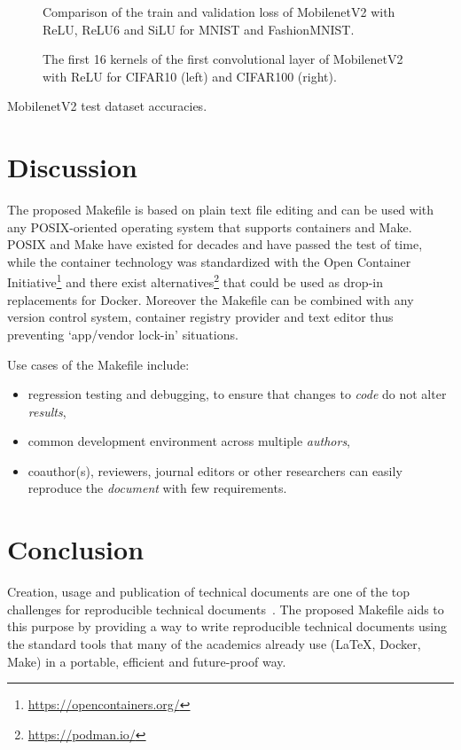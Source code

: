\documentclass[journal]{IEEEtran}
\begin{document}
\begin{figure}[!t]
	\caption{Comparison of the train and validation loss of MobilenetV2 with ReLU, ReLU6 and SiLU for MNIST and FashionMNIST.}
	\label{fig:loss}
\end{figure}

\begin{figure}[!t]
	\caption{The first 16 kernels of the first convolutional layer of MobilenetV2 with ReLU for CIFAR10 (left) and CIFAR100 (right).}
	\label{fig:kernels}
\end{figure}

\begin{table}[h]
	\centering
	\caption{MobilenetV2 test dataset accuracies.}
	\label{table:table}
	\setlength\tabcolsep{4pt}
	
\end{table}

\section{Discussion}
The proposed Makefile is based on plain text file editing and can be used with any POSIX-oriented operating system that supports containers and Make.
POSIX and Make have existed for decades and have passed the test of time, while the container technology was standardized with the Open Container Initiative\footnote{\url{https://opencontainers.org/}} and there exist alternatives\footnote{\url{https://podman.io/}} that could be used as drop-in replacements for Docker.
Moreover the Makefile can be combined with any version control system, container registry provider and text editor thus preventing `app/vendor lock-in' situations.

Use cases of the Makefile include:
\begin{itemize}
	\item regression testing and debugging, to ensure that changes to \textit{code} do not alter \textit{results},
	\item common development environment across multiple \textit{authors},
	\item coauthor(s), reviewers, journal editors or other researchers can easily reproduce the \textit{document} with few requirements.
\end{itemize}

\section{Conclusion}
Creation, usage and publication of technical documents are one of the top challenges for reproducible technical documents~\cite{barba2019praxis}.
The proposed Makefile aids to this purpose by providing a way to write reproducible technical documents using the standard tools that many of the academics already use (\LaTeX, Docker, Make) in a portable, efficient and future-proof way.



\end{document}
